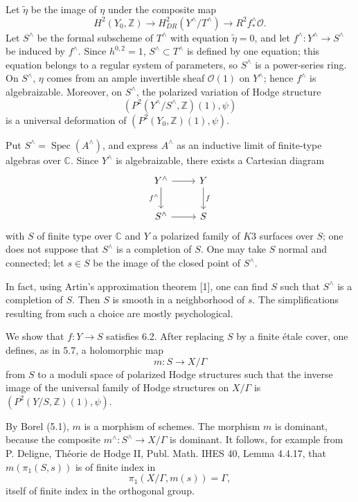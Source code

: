 \documentclass[10pt]{article}
\newcommand{\C}{\mathbb{C}}
\newcommand{\Z}{\mathbb{Z}}
\newcommand{\Spec}{\operatorname{Spec}}
\begin{document}
Let $\tilde\eta$ be the image of $\eta$ under the composite map
\[
H^2(Y_0,\Z)\longrightarrow H^2_{DR}(Y^\wedge/T^\wedge)\longrightarrow R^2f^\wedge_*\mathcal O.
\]
Let $S^\wedge$ be the formal subscheme of $T^\wedge$ with equation $\tilde\eta=0$, and let $f^\wedge:Y^\wedge\to S^\wedge$ be induced by $f^\wedge$. Since $h^{0,2}=1$, $S^\wedge\subset T^\wedge$ is defined by one equation; this equation belongs to a regular system of parameters, so $S^\wedge$ is a power-series ring. On $S^\wedge$, $\eta$ comes from an ample invertible sheaf $\mathcal O(1)$ on $Y^\wedge$; hence $f^\wedge$ is algebraizable. Moreover, on $S^\wedge$, the polarized variation of Hodge structure
\[
(P^2(Y^\wedge/S^\wedge,\Z)(1),\psi)
\]
is a universal deformation of $(P^2(Y_0,\Z)(1),\psi)$.

Put $S^\wedge=\Spec(A^\wedge)$, and express $A^\wedge$ as an inductive limit of finite-type algebras over $\C$. Since $Y^\wedge$ is algebraizable, there exists a Cartesian diagram
\[
\begin{tikzcd}[column sep=2.4em,row sep=2.2em]
Y^\wedge \arrow[r] \arrow[d,"f^\wedge"'] & Y \arrow[d,"f"]\\
S^\wedge \arrow[r] & S
\end{tikzcd}
\]
with $S$ of finite type over $\C$ and $Y$ a polarized family of $K3$ surfaces over $S$; one does not suppose that $S^\wedge$ is a completion of $S$. One may take $S$ normal and connected; let $s\in S$ be the image of the closed point of $S^\wedge$.

In fact, using Artin's approximation theorem [1], one can find $S$ such that $S^\wedge$ is a completion of $S$. Then $S$ is smooth in a neighborhood of $s$. The simplifications resulting from such a choice are mostly psychological.

We show that $f:Y\to S$ satisfies 6.2. After replacing $S$ by a finite étale cover, one defines, as in 5.7, a holomorphic map
\[
m:S\longrightarrow X/\Gamma
\]
from $S$ to a moduli space of polarized Hodge structures such that the inverse image of the universal family of Hodge structures on $X/\Gamma$ is $(P^2(Y/S,\Z)(1),\psi)$.

By Borel (5.1), $m$ is a morphism of schemes. The morphism $m$ is dominant, because the composite $m^\wedge:S^\wedge\to X/\Gamma$ is dominant. It follows, for example from P. Deligne, Théorie de Hodge II, Publ. Math. IHES 40, Lemma 4.4.17, that $m(\pi_1(S,s))$ is of finite index in
\[
\pi_1(X/\Gamma,m(s))=\Gamma,
\]
itself of finite index in the orthogonal group.
\end{document}
